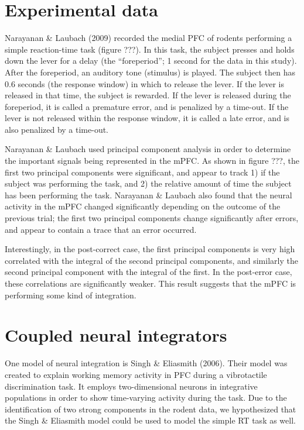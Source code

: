 \documentclass[12pt]{article}
\begin{document}
\section{Experimental data}

Narayanan \& Laubach (2009) recorded the medial PFC
of rodents performing a simple reaction-time task
(figure ???).
In this task, the subject presses and holds down the lever
for a delay (the ``foreperiod'';
1 second for the data in this study).
After the foreperiod, an auditory tone (stimulus) is played.
The subject then has 0.6 seconds (the response window)
in which to release the lever.
If the lever is released in that time,
the subject is rewarded.
If the lever is released during the foreperiod,
it is called a premature error,
and is penalized by a time-out.
If the lever is not released within the response window,
it is called a late error,
and is also penalized by a time-out.

Narayanan \& Laubach used principal component analysis
in order to determine the important signals
being represented in the mPFC.
As shown in figure ???,
the first two principal components were significant,
and appear to track
1) if the subject was performing the task, and
2) the relative amount of time the subject has been
performing the task.
Narayanan \& Laubach also found that the neural activity
in the mPFC changed significantly depending on
the outcome of the previous trial;
the first two principal components
change significantly after errors,
and appear to contain a trace that an error occurred.

Interestingly, in the post-correct case,
the first principal components
is very high correlated with the integral
of the second principal components,
and similarly the second principal component
with the integral of the first.
In the post-error case,
these correlations are significantly weaker.
This result suggests that
the mPFC is performing some kind of integration.

\section{Coupled neural integrators}

One model of neural integration is
Singh \& Eliasmith (2006).
Their model was created to explain working memory activity
in PFC during a vibrotactile discrimination task.
It employs two-dimensional neurons in integrative populations
in order to show time-varying activity during the task.
Due to the identification of two strong components
in the rodent data,
we hypothesized that the Singh \& Eliasmith model
could be used to model the simple RT task as well.
\end{document}
